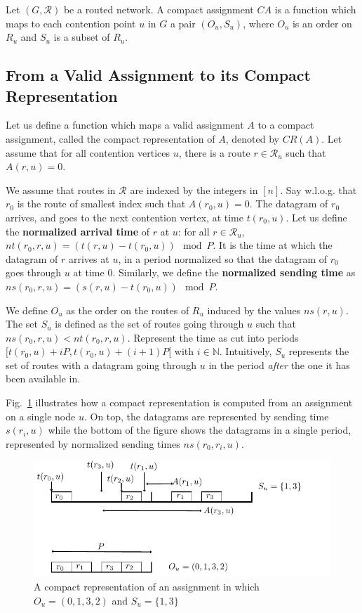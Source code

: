 \documentclass[english]{article}
\begin{document}
\begin{definition}
Let $(G, \mathcal{R})$ be a routed network. A compact assignment $CA$ is a function which maps to each contention point $u$ in $G$ a pair $(O_u,S_u)$, where $O_u$ is an order on $R_u$ and $S_u$ is a subset of $R_u$.
\label{definition:compact}
\end{definition}


\subsection{From a Valid Assignment to its Compact Representation}

Let us define a function which maps a valid assignment $A$ to a compact assignment, called the compact representation of $A$, denoted by $CR(A)$. Let assume that for all contention vertices $u$, there is a route $r \in \mathcal{R}_u$ such that $A(r,u) = 0$.

We assume that routes in $\mathcal{R}$ are indexed by the integers in $[n]$. Say w.l.o.g. that $r_0$ is the route of smallest index such that $A(r_0,u) = 0$. The datagram of $r_0$ arrives, and goes to the next contention vertex, at time $t(r_0,u)$. Let us define the \textbf{normalized arrival time} of $r$ at $u$: for all $r \in \mathcal{R}_u$, $nt(r_0,r,u) = (t(r,u) - t(r_0,u)) \mod P$. It is the time at which the datagram of $r$ arrives at $u$, in a period normalized so that the datagram of $r_0$ goes through $u$ at time $0$. Similarly, we define the \textbf{normalized sending time} as $ns(r_0,r,u) = (s(r,u) - t(r_0,u)) \mod P$.

We define $O_u$ as the order on the routes of $R_u$ induced by the values $ns(r,u)$. The set $S_u$ is defined as the set of routes going through $u$ such that $ns(r_0,r,u) < nt(r_0,r,u)$. Represent the time as cut into periods $[t(r_0,u) + iP,t(r_0,u) + (i+1)P [$ with $i \in \mathbb{N}$. Intuitively, $S_u$ represents the set of routes with a datagram going through $u$ in the period \emph{after} the one it has been available in. 

Fig.~\ref{fig:normalizedassignment} illustrates how a compact representation is computed from an assignment on a single node $u$. On top, the datagrams are represented by sending time $s(r_i,u)$ while the bottom of the figure shows the datagrams in a single period, represented by normalized sending times $ns(r_0,r_i,u)$.  
\begin{figure}[!h]
	\centering
	\includegraphics[scale=1]{normalizedassignment}
\caption{A compact representation of an assignment in which $O_u = (0,1,3,2)$ and $S_u = \{1,3\}$ }
\label{fig:normalizedassignment}
\end{figure}
\end{document}
